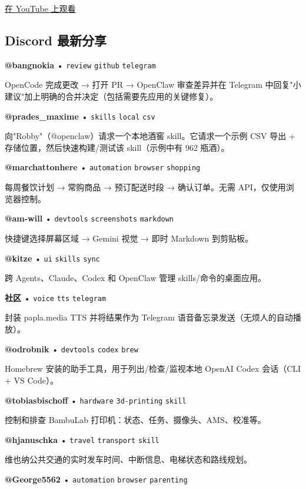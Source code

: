 \href{https://www.youtube.com/watch?v=5kkIJNUGFho}{在 YouTube 上观看}

\subsection{ Discord 最新分享}



\textbf{@bangnokia} • \texttt{review} \texttt{github} \texttt{telegram}

OpenCode 完成更改 → 打开 PR → OpenClaw 审查差异并在 Telegram 中回复"小建议"加上明确的合并决定（包括需要先应用的关键修复）。


\textbf{@prades\_maxime} • \texttt{skills} \texttt{local} \texttt{csv}

向"Robby"（@openclaw）请求一个本地酒窖 skill。它请求一个示例 CSV 导出 + 存储位置，然后快速构建/测试该 skill（示例中有 962 瓶酒）。


\textbf{@marchattonhere} • \texttt{automation} \texttt{browser} \texttt{shopping}

每周餐饮计划 → 常购商品 → 预订配送时段 → 确认订单。无需 API，仅使用浏览器控制。


\textbf{@am-will} • \texttt{devtools} \texttt{screenshots} \texttt{markdown}

快捷键选择屏幕区域 → Gemini 视觉 → 即时 Markdown 到剪贴板。


\textbf{@kitze} • \texttt{ui} \texttt{skills} \texttt{sync}

跨 Agents、Claude、Codex 和 OpenClaw 管理 skills/命令的桌面应用。


\textbf{社区} • \texttt{voice} \texttt{tts} \texttt{telegram}

封装 papla.media TTS 并将结果作为 Telegram 语音备忘录发送（无烦人的自动播放）。


\textbf{@odrobnik} • \texttt{devtools} \texttt{codex} \texttt{brew}

Homebrew 安装的助手工具，用于列出/检查/监视本地 OpenAI Codex 会话（CLI + VS Code）。


\textbf{@tobiasbischoff} • \texttt{hardware} \texttt{3d-printing} \texttt{skill}

控制和排查 BambuLab 打印机：状态、任务、摄像头、AMS、校准等。


\textbf{@hjanuschka} • \texttt{travel} \texttt{transport} \texttt{skill}

维也纳公共交通的实时发车时间、中断信息、电梯状态和路线规划。


\textbf{@George5562} • \texttt{automation} \texttt{browser} \texttt{parenting}


